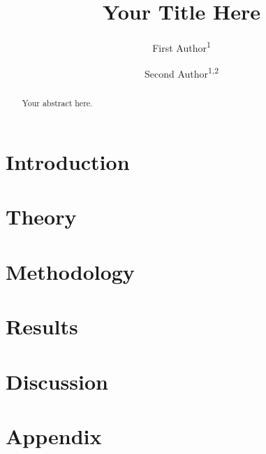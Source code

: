\documentclass[a4paper,11pt]{article}
\title{Your Title Here}
\author{
  First Author\textsuperscript{1} \and
  Second Author\textsuperscript{1,2}
}
\date{}
\begin{document}
\maketitle

\begin{abstract}
Your abstract here.
\end{abstract}

\section{Introduction}


\section{Theory}


\section{Methodology}


\section{Results}


\section{Discussion}


\newpage
\printbibliography

\newpage
\appendix
\section{Appendix}
\end{document}
